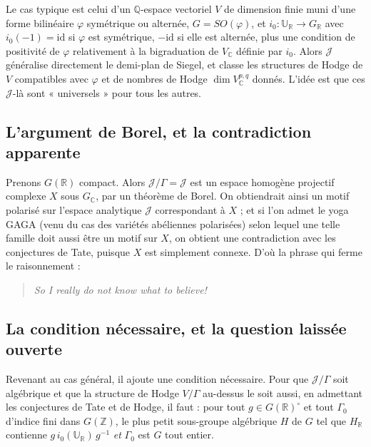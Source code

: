 \documentclass[11pt,a4paper]{article}
\begin{document}
Le cas typique est celui d'un $\mathbb{Q}$-espace vectoriel $V$ de dimension
finie muni d'une forme bilinéaire $\varphi$ symétrique ou alternée,
$G = SO(\varphi)$, et $i_{0} : \mathbb{U}_{\mathbb{R}} \to G_{\mathbb{R}}$ avec
$i_{0}(-1) = \mathrm{id}$ si $\varphi$ est symétrique, $-\mathrm{id}$ si elle
est alternée, plus une condition de positivité de $\varphi$ relativement à la
bigraduation de $V_{\mathbb{C}}$ définie par $i_{0}$. Alors $\mathcal{J}$
généralise directement le demi-plan de Siegel, et classe les structures de Hodge
de $V$ compatibles avec $\varphi$ et de nombres de Hodge $\dim
V_{\mathbb{C}}^{p,q}$ donnés. L'idée est que ces $\mathcal{J}$-là sont
« universels » pour tous les autres.

\subsection*{L'argument de Borel, et la contradiction apparente}

Prenons $G(\mathbb{R})$ compact. Alors $\mathcal{J}/\Gamma = \mathcal{J}$ est un
espace homogène projectif complexe $X$ sous $G_{\mathbb{C}}$, par un théorème de
Borel. On obtiendrait ainsi un motif polarisé sur l'espace analytique
$\mathcal{J}$ correspondant à $X$ ; et si l'on admet le yoga GAGA (venu du cas
des variétés abéliennes polarisées) selon lequel une telle famille doit aussi
être un motif sur $X$, on obtient une contradiction avec les conjectures de
Tate, puisque $X$ est simplement connexe. D'où la phrase qui ferme le
raisonnement :

\begin{quote}
\emph{So I really do not know what to believe!}
\end{quote}

\subsection*{La condition nécessaire, et la question laissée ouverte}

Revenant au cas général, il ajoute une condition nécessaire. Pour que
$\mathcal{J}/\Gamma$ soit algébrique et que la structure de Hodge $V/\Gamma$
au-dessus le soit aussi, en admettant les conjectures de Tate et de Hodge, il
faut : pour tout $g \in G(\mathbb{R})^{\circ}$ et tout $\Gamma_{0}$ d'indice fini
dans $G(\mathbb{Z})$, le plus petit sous-groupe algébrique $H$ de $G$ tel que
$H_{\mathbb{R}}$ contienne $g\, i_{0}(\mathbb{U}_{\mathbb{R}})\, g^{-1}$
\emph{et} $\Gamma_{0}$ est $G$ tout entier.
\end{document}
